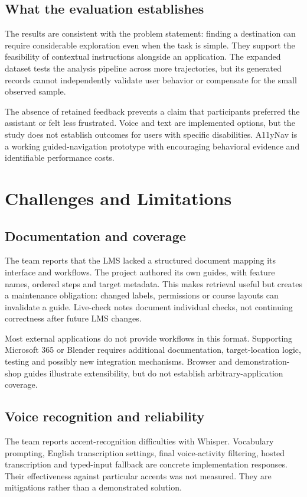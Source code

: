 \documentclass[11pt,a4paper]{article}
\begin{document}
\subsection{What the evaluation establishes}
The results are consistent with the problem statement: finding a destination can require considerable exploration even when the task is simple. They support the feasibility of contextual instructions alongside an application. The expanded dataset tests the analysis pipeline across more trajectories, but its generated records cannot independently validate user behavior or compensate for the small observed sample.

The absence of retained feedback prevents a claim that participants preferred the assistant or felt less frustrated. Voice and text are implemented options, but the study does not establish outcomes for users with specific disabilities. A11yNav is a working guided-navigation prototype with encouraging behavioral evidence and identifiable performance costs.

\section{Challenges and Limitations}
\subsection{Documentation and coverage}
The team reports that the LMS lacked a structured document mapping its interface and workflows. The project authored its own guides, with feature names, ordered steps and target metadata. This makes retrieval useful but creates a maintenance obligation: changed labels, permissions or course layouts can invalidate a guide. Live-check notes document individual checks, not continuing correctness after future LMS changes.

Most external applications do not provide workflows in this format. Supporting Microsoft 365 or Blender requires additional documentation, target-location logic, testing and possibly new integration mechanisms. Browser and demonstration-shop guides illustrate extensibility, but do not establish arbitrary-application coverage.

\subsection{Voice recognition and reliability}
The team reports accent-recognition difficulties with Whisper. Vocabulary prompting, English transcription settings, final voice-activity filtering, hosted transcription and typed-input fallback are concrete implementation responses. Their effectiveness against particular accents was not measured. They are mitigations rather than a demonstrated solution.
\end{document}
